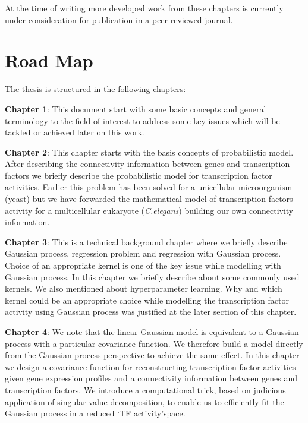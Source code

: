 At the time of writing more developed work from these chapters is currently under consideration for publication in a peer-reviewed journal.

\section{Road Map}
The thesis is structured in the following chapters:

\textbf{Chapter 1}: This document start with some basic concepts and general terminology to the field of interest to address some key issues which will be tackled or achieved later on this work.

\textbf{Chapter 2}: This chapter starts with the basis concepts of probabilistic model. After describing the connectivity information between genes and transcription factors we briefly describe the probabilistic model for transcription factor activities. Earlier this problem has been solved for a unicellular microorganism (yeast) but we have forwarded the mathematical model of transcription factors activity for a multicellular eukaryote (\textit{C.elegans}) building our own connectivity information.
 
\textbf{Chapter 3}:
This is a technical background chapter where we briefly describe Gaussian process, regression problem and regression with Gaussian process. Choice of an appropriate kernel is one of the key issue while modelling with Gaussian process. In this chapter we briefly describe about some commonly used kernels. We also mentioned about hyperparameter learning. Why and which kernel could be an appropriate choice while modelling the transcription factor activity using Gaussian process was justified at the later section of this chapter.

\textbf{Chapter 4}:
We note that the linear Gaussian model is equivalent to a Gaussian process with a particular covariance function. We therefore build a model directly from the Gaussian process perspective to achieve the same effect. In this chapter we design a covariance function for reconstructing transcription factor activities given gene expression profiles and a connectivity information between genes and transcription factors. We introduce a computational trick, based on  judicious application of singular value decomposition, to enable us to efficiently fit the Gaussian process in a reduced \lq TF activity\rq space. 

